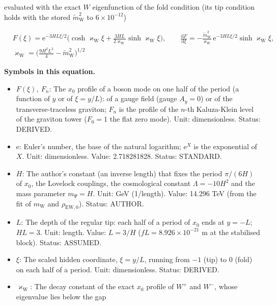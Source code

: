 \documentclass[
  10pt,
]{article}
\providecommand{\tightlist}{%
  \setlength{\itemsep}{0pt}\setlength{\parskip}{0pt}}
\begin{document}
evaluated with the exact \(W\) eigenfunction of the fold condition (its
tip condition holds with the stored \(\tilde m_{\mathrm{W}}^2\) to
\(6\times10^{-12}\))

\[
\begin{aligned}
&F(\xi) = \mathrm{e}^{-3HL\xi/2}\Big(\cosh\varkappa_{\mathrm{W}}\xi + \frac{3HL}{2\varkappa_{\mathrm{W}}}\sinh\varkappa_{\mathrm{W}}\xi\Big),
\qquad \frac{\mathrm{d}F}{\mathrm{d}\xi} = -\frac{\tilde m_{\mathrm{W}}^2}{\varkappa_{\mathrm{W}}}\,\mathrm{e}^{-3HL\xi/2}\sinh\varkappa_{\mathrm{W}}\xi,\\
&\varkappa_{\mathrm{W}} = \Big(\frac{9H^2L^2}{4} - \tilde m_{\mathrm{W}}^2\Big)^{1/2}
\end{aligned}
\]

\textbf{Symbols in this equation.}

\begin{itemize}
\tightlist
\item
  \(F(\xi),\ F_n\): The \(x_0\) profile of a boson mode on one half of
  the period (a function of \(y\) or of \(\xi = y/L\)): of a gauge field
  (gauge \(A_y = 0\)) or of the transverse-traceless graviton; \(F_n\)
  is the profile of the \(n\)-th Kaluza-Klein level of the graviton
  tower (\(F_0 = 1\) the flat zero mode). Unit: dimensionless. Status:
  DERIVED.
\item
  \(\mathrm{e}\): Euler's number, the base of the natural logarithm;
  \(\mathrm{e}^{X}\) is the exponential of \(X\). Unit: dimensionless.
  Value: 2.718281828. Status: STANDARD.
\item
  \(H\): The author's constant (an inverse length) that fixes the period
  \(\pi/(6H)\) of \(x_0\), the Lovelock couplings, the cosmological
  constant \(\Lambda = -10H^2\) and the mass parameter \(m_\Psi = H\).
  Unit: GeV (1/length). Value: 14.296 TeV (from the fit of
  \(m_{\mathrm{W}}\) and \(\rho_{\mathrm{EW},0}\)). Status: AUTHOR.
\item
  \(L\): The depth of the regular tip: each half of a period of \(x_0\)
  ends at \(y = -L\); \(HL = 3\). Unit: length. Value: \(L = 3/H\)
  (\(fL = 8.926\times10^{-21}\) m at the stabilised block). Status:
  ASSUMED.
\item
  \(\xi\): The scaled hidden coordinate, \(\xi = y/L\), running from
  \(-1\) (tip) to \(0\) (fold) on each half of a period. Unit:
  dimensionless. Status: DERIVED.
\item
  \(\varkappa_{\mathrm{W}}\): The decay constant of the exact \(x_0\)
  profile of \(W^+\) and \(W^-\), whose eigenvalue lies below the gap

\end{itemize}
\end{document}
